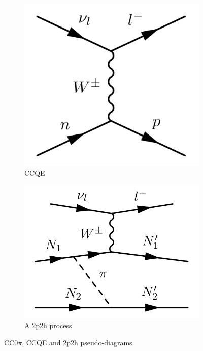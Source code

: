 \begin{figure}[h]
\begin{subfigure}[t]{0.32\textwidth}
		\includegraphics[width=\textwidth, trim={0mm 0mm 0mm 0mm}, clip,page=1]{figures/niwg/diagrams/CCQE}
		\caption{CCQE}
	\end{subfigure}
	\begin{subfigure}[t]{0.32\textwidth}
		\includegraphics[width=\textwidth, trim={0mm 0mm 0mm 0mm}, clip,page=1]{figures/niwg/diagrams/2p2h_possibly}
		\caption{A 2p2h process}
	\end{subfigure}
	\caption{CC0$\pi$, CCQE and 2p2h pseudo-diagrams}
	\label{fig:cc0pi_diag}
\end{figure}

